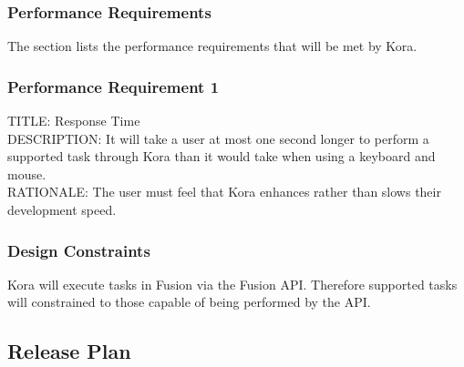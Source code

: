 \documentclass[onecolumn, draftclsnofoot,10pt, compsoc]{IEEEtran}
\def \botname{Kora\xspace}
\begin{document}
	\subsubsection{Performance Requirements}
	The section lists the performance requirements that will be met by \botname.

	\subsubsection{Performance Requirement 1}
	TITLE: Response Time \\
	DESCRIPTION: It will take a user at most one second longer to perform a supported task through \botname than it would take when using a keyboard and mouse. \\
	RATIONALE: The user must feel that \botname enhances rather than slows their development speed.

	\subsubsection{Design Constraints}
	\botname will execute tasks in Fusion via the Fusion API.
	Therefore supported tasks will constrained to those capable of being performed by the API.

	\subsection{Release Plan}
\end{document}
